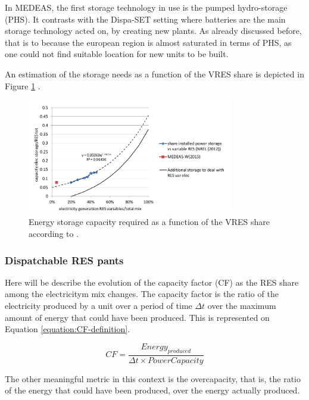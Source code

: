 In MEDEAS, the first storage technology in use is the pumped hydro-storage (PHS). It contrasts with the Dispa-SET setting where batteries are the main storage technology acted on, by creating new plants. As already discussed before, that is to because the european region is almost saturated in terms of PHS, as one could not find suitable location for new units to be built.

An estimation of the storage needs as a function of the VRES share is depicted in Figure \ref{fig:storage-vres} \cite{NREL}.

\begin{figure}[h]
    \includegraphics[width=0.8\textwidth]{resources/images/storage.png}
    \caption{Energy storage capacity required as a function of the VRES share according to \cite{NREL}.}
    \label{fig:storage-vres}
\end{figure}

\subsubsection{Dispatchable RES pants}

Here will be describe the evolution of the capacity factor (CF) as the RES share among the electricitym mix changes. The capacity factor is the ratio of the electricity produced by a unit over a period of time $\Delta t$ over the maximum amount of energy that could have been produced. This is represented on Equation \ref{equation:CF-definition}.


\begin{equation}
    CF = \frac{Energy_{produced}}{\Delta t \times PowerCapacity}
    \label{equation:CF-definition}
\end{equation}

The other meaningful metric in this context is the overcapacity, that is, the ratio of the energy that could have been produced, over the energy actually produced. %

